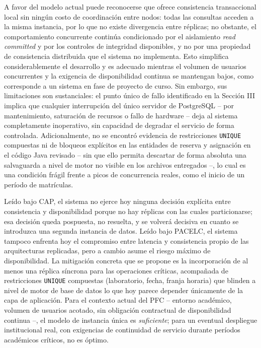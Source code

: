 \documentclass[conference]{IEEEtran}
\begin{document}
A favor del modelo actual puede reconocerse que ofrece consistencia transaccional local sin ning\'un costo de coordinaci\'on entre nodos: todas las consultas acceden a la misma instancia, por lo que no existe divergencia entre r\'eplicas; no obstante, el comportamiento concurrente continúa condicionado por el aislamiento \emph{read committed} y por los controles de integridad disponibles, y no por una propiedad de consistencia distribuida que el sistema no implementa. Esto simplifica considerablemente el desarrollo y es adecuado mientras el volumen de usuarios concurrentes y la exigencia de disponibilidad continua se mantengan bajos, como corresponde a un sistema en fase de proyecto de curso. Sin embargo, sus limitaciones son sustanciales: el punto \'unico de fallo identificado en la Secci\'on III implica que cualquier interrupci\'on del \'unico servidor de PostgreSQL -- por mantenimiento, saturaci\'on de recursos o fallo de hardware -- deja al sistema completamente inoperativo, sin capacidad de degradar el servicio de forma controlada. Adicionalmente, no se encontr\'o evidencia de restricciones \texttt{UNIQUE} compuestas ni de bloqueos expl\'icitos en las entidades de reserva y asignaci\'on en el c\'odigo Java revisado -- sin que ello permita descartar de forma absoluta una salvaguarda a nivel de motor no visible en los archivos entregados --, lo cual es una condici\'on fr\'agil frente a picos de concurrencia reales, como el inicio de un per\'iodo de matr\'iculas.

Le\'ido bajo CAP, el sistema no ejerce hoy ninguna decisi\'on expl\'icita entre consistencia y disponibilidad porque no hay r\'eplicas con las cuales particionarse; esa decisi\'on queda pospuesta, no resuelta, y se volver\'a decisiva en cuanto se introduzca una segunda instancia de datos. Le\'ido bajo PACELC, el sistema tampoco enfrenta hoy el compromiso entre latencia y consistencia propio de las arquitecturas replicadas, pero a cambio asume el riesgo m\'aximo de disponibilidad. La mitigaci\'on concreta que se propone es la incorporaci\'on de al menos una r\'eplica s\'incrona para las operaciones cr\'iticas, acompa\~nada de restricciones \texttt{UNIQUE} compuestas (laboratorio, fecha, franja horaria) que blinden a nivel de motor de base de datos lo que hoy parece depender \'unicamente de la capa de aplicaci\'on. Para el contexto actual del PFC -- entorno acad\'emico, volumen de usuarios acotado, sin obligaci\'on contractual de disponibilidad continua --, el modelo de instancia \'unica es \emph{suficiente}; para un eventual despliegue institucional real, con exigencias de continuidad de servicio durante per\'iodos acad\'emicos cr\'iticos, no es \'optimo.
\end{document}
